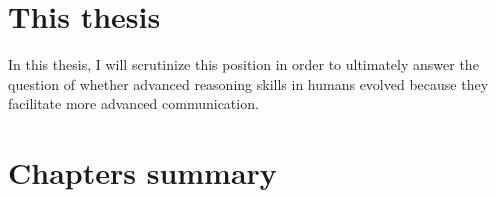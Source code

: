 \section{This thesis}

In this thesis, I will scrutinize this position in order to ultimately
answer the question of whether advanced reasoning skills in humans evolved because they facilitate more advanced communication.


\section{Chapters summary}
